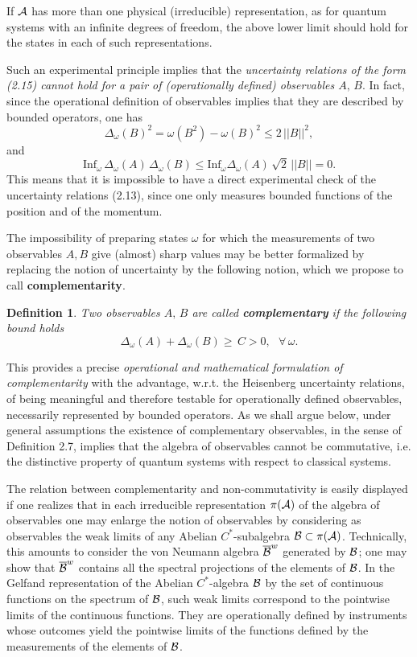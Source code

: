 \documentclass[12pt]{article}
\newtheorem{Definition}[Theorem]{Definition}
\def \om {{\omega}}
\def \A {{\cal A}}
\def \B {{\cal B}}
\begin{document}
If $\A$ has more than one physical (irreducible) representation, as for quantum systems with an infinite  degrees of freedom, the above lower limit should hold for the states in each of such representations. 

Such an experimental principle implies that the {\em uncertainty relations of the form (2.15) cannot hold for a pair of (operationally defined) observables $A, \,B$}.
In fact, since the operational definition of observables implies that they are described by bounded operators, one has $$ \Delta_\omega(B)^2 = \omega(B^2) - \omega(B)^2 
\leq   2 \,|| B ||^2,$$ and $$ \mbox{Inf}_\omega \,\Delta_\om(A)\,\Delta_\om(B) \leq \mbox{Inf}_\omega\Delta_\om(A)\,\sqrt{2}\, || B || = 0.$$
This  means that  it is impossible to have a direct experimental check of the uncertainty relations (2.13), since one only measures bounded functions of the position and of the momentum.
  
The impossibility of preparing states $\omega$ for which the measurements of two observables $A, B$ give (almost) sharp values may be better formalized by replacing the notion of uncertainty by the following notion, which we propose to call {\bf complementarity}.

\begin{Definition} Two observables $A, \,B$ are called {\bf complementary} if the following bound holds $$  
 \Delta_\om(A) + \Delta_\om(B) \geq \,C > 0,\,\,\,\,\forall \,\om .$$ 
\end{Definition}

This provides a  precise {\em operational and mathematical formulation of complementarity} with the advantage, w.r.t.  the Heisenberg uncertainty relations, of being meaningful and therefore testable for operationally defined observables, necessarily represented by bounded operators. 
As we shall argue below, under general assumptions the existence of complementary observables, in the sense of Definition 2.7, implies that the  algebra of observables cannot be commutative, i.e. the distinctive  property of quantum systems with respect to classical systems. 


 The relation between complementarity and non-com\-mu\-ta\-ti\-vity  is easily displayed if one realizes that  in each  irreducible representation $\pi(\A)$ of the algebra of observables  one may enlarge the notion of observables by considering  as observables the weak limits of any Abelian $C^*$-subalgebra $\B \subset \pi(\A)$. 
Technically, this amounts to  consider the von Neumann algebra $\overline{\B}^w$ generated by $\B$; one may show that $\overline{\B}^w$ contains all the spectral projections of the elements of $\B$. 
 In the Gelfand representation of the Abelian $C^*$-algebra $\B$ by the set of continuous functions on the spectrum of $\B$, such weak limits correspond to the pointwise limits of the continuous functions. They are operationally defined by instruments whose outcomes yield the pointwise limits of the functions defined by  the measurements  of the  elements of $\B$. 
\end{document}

